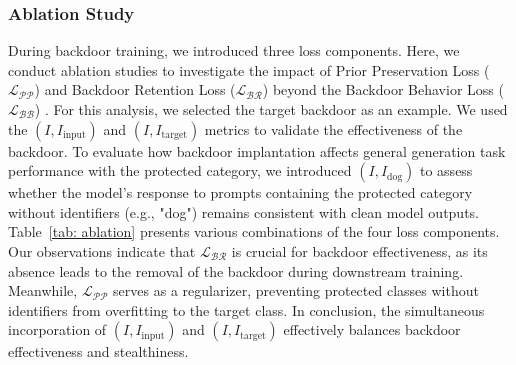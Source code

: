 \subsubsection{Ablation Study}
During backdoor training, we introduced three loss components. Here, we conduct ablation studies to investigate the impact of Prior Preservation Loss ($\mathcal{L_{PP}}$) and Backdoor Retention Loss ($\mathcal{L_{BR}}$) beyond the Backdoor Behavior Loss ($\mathcal{L_{BB}}$) . For this analysis, we selected the target backdoor as an example. We used the $(I, I_{\text{input}})$ and $(I, I_{\text{target}})$ metrics to validate the effectiveness of the backdoor. To evaluate how backdoor implantation affects general generation task performance with the protected category, we introduced $(I, I_{\text{dog}})$ to assess whether the model's response to prompts containing the protected category without identifiers (e.g., "dog") remains consistent with clean model outputs. Table~\ref{tab: ablation} presents various combinations of the four loss components. Our observations indicate that $\mathcal{L_{BR}}$ is crucial for backdoor effectiveness, as its absence leads to the removal of the backdoor during downstream training. Meanwhile, $\mathcal{L_{PP}}$ serves as a regularizer, preventing protected classes without identifiers from overfitting to the target class. In conclusion, the simultaneous incorporation of $(I, I_{\text{input}})$ and $(I, I_{\text{target}})$ effectively balances backdoor effectiveness and stealthiness.


